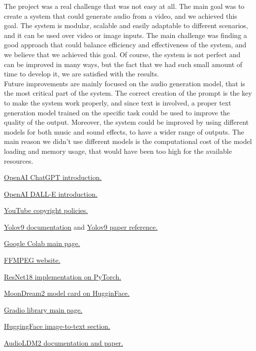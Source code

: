 \documentclass[conference]{IEEEtran}
\begin{document}
The project was a real challenge that was not easy at all. The main goal was to create a system that could generate audio from a video, and we achieved this goal. The system is modular, scalable and easily adaptable to different scenarios, and it can be used over video or image inputs. 
The main challenge was finding a good approach that could balance efficiency and effectiveness of the system, and we believe that we achieved this goal. Of course, the system is not perfect and can be improved in many ways, but the fact that we had such small amount of time to develop it, we are satisfied with the results.\\
Future improvements are mainly focused on the audio generation model, that is the most critical part of the system. The correct creation of the prompt is the key to make the system work properly, and since text is involved, a proper text generation model trained 
on the specific task could be used to improve the quality of the output. Moreover, the system could be improved by using different models for both music and sound effects, to have a wider range of outputs. The main
reason we didn't use different models is the computational cost of the model loading and memory usage, that would have been too high for the available resources.\\  



\begin{thebibliography}{00}


        \href{https://openai.com/index/chatgpt/}{OpenAI ChatGPT introduction.}

        \href{https://openai.com/index/dall-e/}{OpenAI DALL-E introduction.}

        \href{https://support.google.com/youtube/answer/6364458?hl=en}{YouTube copyright policies.}

        \href{https://docs.ultralytics.com/models/yolov9/}{Yolov9 documentation} and 
        \href{https://docs.ultralytics.com/models/yolov9/\#citations-and-acknowledgements}{Yolov9 paper reference.}
    
        \href{https://colab.research.google.com/}{Google Colab main page.}

        \href{https://ffmpeg.org}{FFMPEG website.}
    
        \href{https://pytorch.org/vision/main/models/generated/torchvision.models.resnet18.html}{ResNet18 implementation on PyTorch.}
    
        \href{https://huggingface.co/vikhyatk/moondream2}{MoonDream2 model card on HugginFace.}
    
        \href{https://www.gradio.app/}{Gradio library main page.}

     \href{https://huggingface.co/models?pipeline_tag=image-to-text&sort=trending}{HuggingFace image-to-text section.}

     \href{https://audioldm.github.io/audioldm2/}{AudioLDM2 documentation and paper.}
\end{thebibliography}
\end{document}
